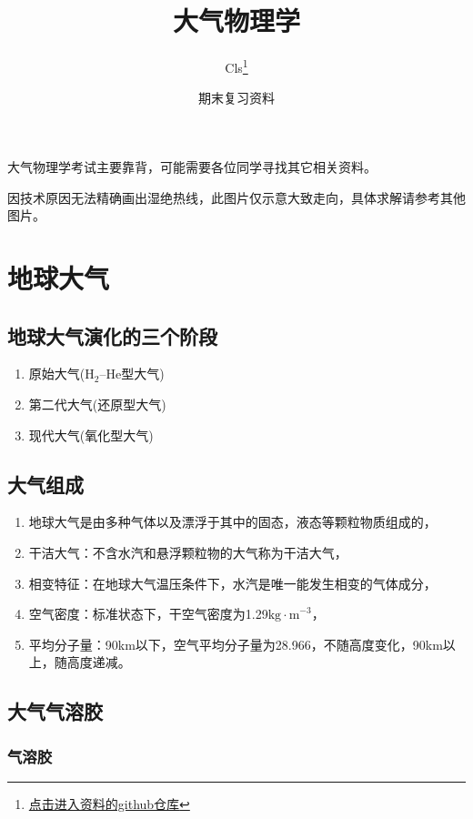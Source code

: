 \documentclass[UTF8,a4paper,11pt,oneside]{ctexbook}
\title{大气物理学}
\author{Cls\thanks{\href{https://github.com/Clignniis}{点击进入资料的github仓库}}}
\date{期末复习资料}
\begin{document}
\frontmatter 
\maketitle

大气物理学考试主要靠背，可能需要各位同学寻找其它相关资料。

因技术原因无法精确画出湿绝热线，此图片仅示意大致走向，具体求解请参考其他图片。

\tableofcontents

\mainmatter

\chapter{地球大气}

\section{地球大气演化的三个阶段}
\begin{enumerate}
    \item 原始大气(\(\mathrm{H}_2\)--\(\mathrm{He}\)型大气)
    \item 第二代大气(还原型大气)
    \item 现代大气(氧化型大气)
\end{enumerate}

\section{大气组成}
\begin{enumerate}
    \item 地球大气是由多种气体以及漂浮于其中的固态，液态等颗粒物质组成的，
    \item 干洁大气：不含水汽和悬浮颗粒物的大气称为干洁大气，
    \item 相变特征：在地球大气温压条件下，水汽是唯一能发生相变的气体成分，
    \item 空气密度：标准状态下，干空气密度为1.29\(\mathrm{kg\cdot{}m}^{-3}\)，
    \item 平均分子量：90km以下，空气平均分子量为28.966，不随高度变化，90km以上，随高度递减。
\end{enumerate}

\section{大气气溶胶}

\subsection{气溶胶}
\end{document}
